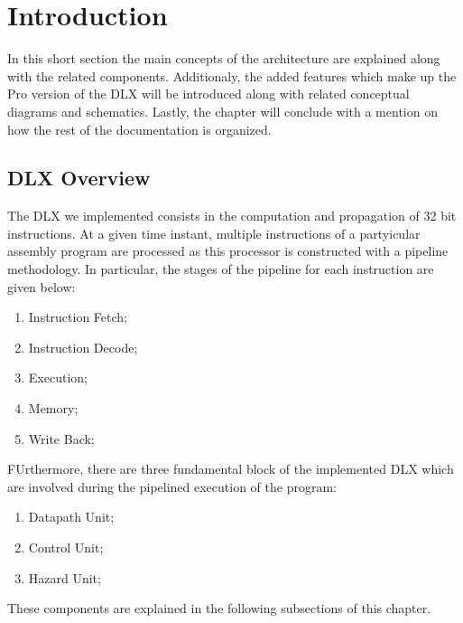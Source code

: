%
\chapter{Introduction}
\label{Introduction}


    \indent In this short section the main concepts of the architecture are explained along with the related components.
    Additionaly, the added features which make up the Pro version of the DLX will be introduced along with related conceptual diagrams and schematics. 
    Lastly, the chapter will conclude with a mention on how the rest of the documentation is organized. 

\section{DLX Overview}
    The DLX we implemented consists in the computation and propagation of 32 bit instructions. 
    At a given time instant, multiple instructions of a partyicular assembly program are processed as this processor is constructed with a pipeline methodology.
    In particular, the stages of the pipeline for each instruction are given below:
    \begin{enumerate}
        \item Instruction Fetch;
        \item Instruction Decode;
        \item Execution;
        \item Memory;
        \item Write Back;
        \end{enumerate}
	\indent FUrthermore, there are three fundamental block of the implemented DLX which are involved during the pipelined execution of the program:
	\begin{enumerate}
        \item Datapath Unit;
        \item Control Unit;
        \item Hazard Unit;
        \end{enumerate}
		These components are explained in the following subsections of this chapter.
